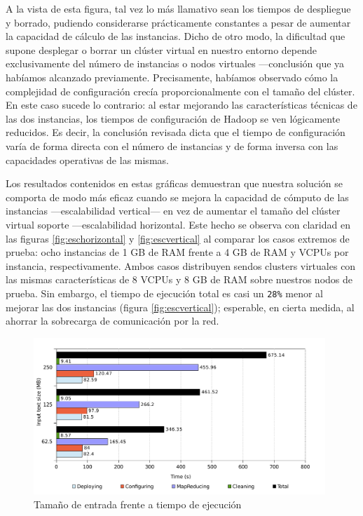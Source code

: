A la vista de esta figura, tal vez lo m\'as llamativo sean los tiempos de des\-plie\-gue y borrado, pudiendo considerarse pr\'acticamente constantes a pesar de aumentar la capacidad de c\'alculo de las instancias. Dicho de otro modo, la dificultad que supone desplegar o borrar un cl\'uster virtual en nuestro entorno depende exclusivamente del n\'umero de instancias o nodos virtuales ---conclusi\'on que ya hab\'iamos alcanzado previamente. Precisamente, hab\'iamos observado c\'omo la complejidad de configuraci\'on crec\'ia proporcionalmente con el tama\~no del cl\'uster. En este caso sucede lo contrario: al estar mejorando las caracter\'isticas t\'ecnicas de las dos instancias, los tiempos de configuraci\'on de Hadoop se ven l\'ogicamente reducidos. Es decir, la conclusi\'on revisada dicta que el tiempo de configuraci\'on var\'ia de forma directa con el n\'umero de instancias y de forma inversa con las capacidades operativas de las mismas. \newline

Los resultados contenidos en estas gr\'aficas demuestran que nuestra soluci\'on se comporta de modo m\'as eficaz cuando se mejora la capacidad de c\'omputo de las instancias ---escalabilidad vertical--- en vez de aumentar el tama\~no del cl\'uster virtual soporte ---escalabilidad horizontal. Este hecho se observa con claridad en las figuras \ref{fig:eschorizontal} y \ref{fig:escvertical} al comparar los casos extremos de prueba: ocho instancias de 1 GB de RAM frente a 4 GB de RAM y VCPUs por ins\-tan\-cia, respectivamente. Ambos casos distribuyen sendos clusters virtuales con las mismas caracter\'isticas de 8 VCPUs y 8 GB de RAM sobre nuestros nodos de prueba. Sin embargo, el tiempo de ejecuci\'on total es casi un \texttt{28\%} menor al mejorar las dos instancias (figura \ref{fig:escvertical}); esperable, en cierta medida, al ahorrar la sobrecarga de comunicaci\'on por la red. \newline

\begin{figure}[tbp]
\begin{center}
\includegraphics[width=0.98\textwidth]{imagenes/042.pdf}
\caption{Tama\~no de entrada frente a tiempo de ejecuci\'on}
\label{fig:evotemporal}
\end{center}
\end{figure}

